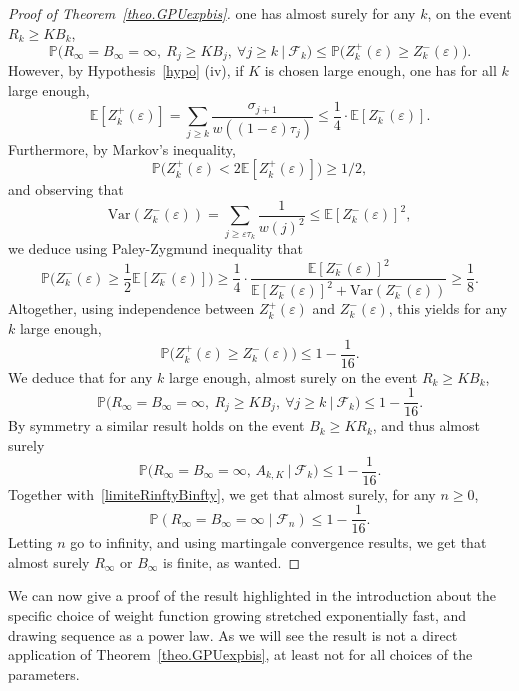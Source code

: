\documentclass[10pt,a4paper]{amsart}
\newcommand{\1}{{\text{\Large $\mathfrak 1$}}}
\begin{document}
\begin{proof}[Proof of Theorem~\ref{theo.GPUexpbis}]
one has almost surely for any $k$, on the event $R_k\ge K B_k$, 
$$\mathbb P\Big(R_\infty = B_\infty = \infty, \ R_j \ge K B_j, \ \forall j\ge k \ \Big|\ \mathcal F_k\Big) \le \mathbb P\big(Z_k^+(\varepsilon) \ge Z_k^-(\varepsilon)\big). $$ 
However, by Hypothesis~\ref{hypo} (iv), if $K$ is chosen large enough, one has for all $k$ large enough, 
$$\mathbb E[Z_k^+(\varepsilon)] = \sum_{j\ge k} \frac{\sigma_{j+1}}{w((1-\varepsilon)\tau_j)} \le \frac 14 \cdot \mathbb E[Z_k^-(\varepsilon)]. $$ 
Furthermore, by Markov's inequality, 
$$\mathbb P\big(Z_k^+(\varepsilon) < 2 \mathbb E[Z_k^+(\varepsilon)] \big) \ge 1/2, $$
and observing that 
$$\text{Var}(Z_k^-(\varepsilon)) = \sum_{j\ge \varepsilon \tau_k} \frac{1}{w(j)^2} \le \mathbb E[Z_k^-(\varepsilon)]^2, $$
we deduce using Paley-Zygmund inequality  that 
$$\mathbb P\Big(Z_k^-(\varepsilon) \ge \frac 12 \mathbb E[Z_k^-(\varepsilon) ]\Big) \ge 
\frac 14\cdot  \frac{\mathbb E[Z_k^-(\varepsilon)]^2}{\mathbb E[Z_k^-(\varepsilon) ]^2 +\text{Var}(Z_k^-(\varepsilon))} \ge \frac 1{8}. $$  
Altogether, using independence between $Z_k^+(\varepsilon)$ and $Z_k^-(\varepsilon)$, this yields for any $k$ large enough, 
$$\mathbb P\big(Z_k^+(\varepsilon) \ge Z_k^-(\varepsilon)\big) \le 1 - \frac 1{16}. $$ 
We deduce that for any $k$ large enough, almost surely on the event $R_k\ge K B_k$, 
$$\mathbb P\Big(R_\infty = B_\infty = \infty, \ R_j \ge K B_j, \ \forall j\ge k \ \Big|\ \mathcal F_k\Big) \le 1- \frac 1{16}. $$ 
By symmetry a similar result holds on the event $B_k \ge KR_k$, and thus almost surely 
$$\mathbb P\big(R_\infty = B_\infty = \infty, \, A_{k,K} \ \big|\ \mathcal F_k\big) \le 1- \frac 1{16}. $$ 
Together with~\eqref{limiteRinftyBinfty}, we get that almost surely, for any $n\ge 0$, 
$$\mathbb P(R_\infty = B_\infty = \infty \mid \mathcal F_n)  \le 1 - \frac 1{16}. $$ 
Letting $n$ go to infinity, and using martingale convergence results, we get that almost surely $R_\infty$ or $B_\infty$ is finite, as wanted. 
\end{proof}

We can now give a proof of the result highlighted in the introduction about the specific choice of weight function growing stretched exponentially fast, and drawing sequence as a power law. As we will see the result is not a direct application of Theorem~\ref{theo.GPUexpbis}, at least not for all choices of the parameters. 
\end{document}
